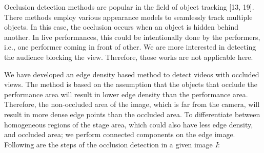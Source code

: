 \documentclass{sig-alternate}
\begin{document}
Occlusion detection methods are popular in the field of object tracking [13, 19]. There methods employ various appearance models to seamlessly track multiple objects. In this case, the occlusion occurs when an object is hidden behind another. In live performances, this could be intentionally done by the performers, i.e., one performer coming in front of other. We are more interested in detecting the audience blocking the view. Therefore, those works are not applicable here.

We have developed an edge density based method to detect videos with occluded views. The method is based on the assumption that the objects that occlude the performance area will result in lower edge density than the performance area. Therefore, the non-occluded area of the image, which is far from the camera, will result in more dense edge points than the occluded area. To differentiate between homogeneous regions of the stage area, which could also have less edge density, and occluded area; we perform connected components on the edge image. Following are the steps of the occlusion detection in a given image \textit{I}:
\end{document}
